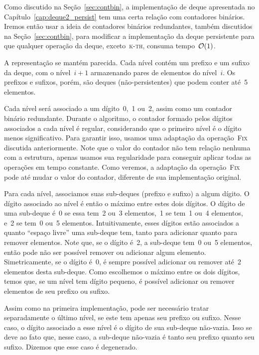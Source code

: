 \documentclass[main.tex]{subfiles}
\begin{document}
Como discutido na Seção~\ref{sec:contbin}, a implementação de deque apresentada no Capítulo~\ref{cap:deque2_persist} tem uma certa relação com contadores binários. Iremos então usar a ideia de contadores binários redundantes, também discutidos na Seção~\ref{sec:contbin}, para modificar a implementação da deque persistente para que qualquer operação da deque, exceto~\textsc{k-th}, consuma tempo~$\mathcal{O}(1)$.

A representação se mantém parecida. Cada nível contém um prefixo e um sufixo da deque, com o nível~$i+1$ armazenando pares de elementos do nível~$i$. Os prefixos e sufixos, porém, são deques (não-persistentes) que podem conter até~5 elementos.

Cada nível será associado a um dígito~0,~1 ou~2, assim como um contador binário redundante. Durante o algoritmo, o contador formado pelos dígitos associados a cada nível é regular, considerando que o primeiro nível é o dígito menos significativo. Para garantir isso, usamos uma adaptação da operação~\textsc{Fix} discutida anteriormente. Note que o valor do contador não tem relação nenhuma com a estrutura, apenas usamos sua regularidade para conseguir aplicar todas as operações em tempo constante. Como veremos, a adaptação da operação~\textsc{Fix} pode até mudar o valor do contador, diferente de sua implementação original.

Para cada nível, associamos suas sub-deques (prefixo e sufixo) a algum dígito. O dígito associado ao nível é então o máximo entre estes dois dígitos. O dígito de uma sub-deque é~0 se essa tem~2 ou~3 elementos,~1 se tem~1 ou~4 elementos, e~2 se tem~0 ou~5 elementos. Intuitivamente, esses dígitos estão associados a quanto ``espaço livre'' uma sub-deque tem, tanto para adicionar quanto para remover elementos. Note que, se o dígito é~2, a sub-deque tem~0 ou~5 elementos, então pode não ser possível remover ou adicionar algum elemento. Simetricamente, se o dígito é~0, é sempre possível adicionar ou remover até~2 elementos desta sub-deque. Como escolhemos o máximo entre os dois dígitos, temos que, se um nível tem dígito pequeno, é possível adicionar ou remover elementos de seu prefixo ou sufixo.

Assim como na primeira implementação, pode ser necessário tratar separadamente o último nível, se este tem apenas seu prefixo ou sufixo. Nesse caso, o dígito associado a esse nível é o dígito de sua sub-deque não-vazia. Isso se deve ao fato que, nesse caso, a sub-deque não-vazia é tanto seu prefixo quanto seu sufixo. Dizemos que esse caso é degenerado.
\end{document}
